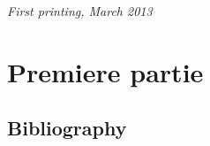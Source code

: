\documentclass[12pt,fleqn]{book} %
\begin{document}
\noindent \textit{First printing, March 2013} %









\pagestyle{empty} %

\tableofcontents %

\cleardoublepage %

\pagestyle{fancy} %


\part{Premiere partie}










\chapter*{Bibliography}
\end{document}
